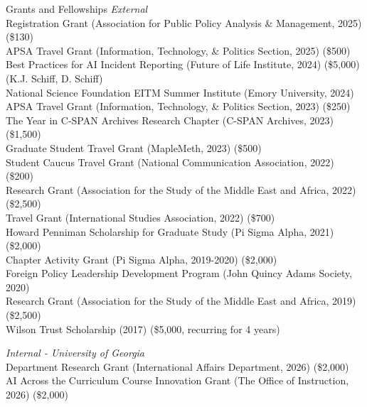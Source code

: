 \documentclass{resume} %
\begin{document}
\begin{rSection}{Grants and Fellowships}
{\it External}
\\ Registration Grant (Association for Public Policy Analysis \& Management, 2025) (\$130)
\\ APSA Travel Grant (Information, Technology, \& Politics Section, 2025) (\$500)
\\Best Practices for AI Incident Reporting (Future of Life Institute, 2024) (\$5,000) (K.J. Schiff, D. Schiff) %
\\National Science Foundation EITM Summer Institute (Emory University, 2024)
\\APSA Travel Grant (Information, Technology, \& Politics Section, 2023) (\$250)
\\The Year in C-SPAN Archives Research Chapter (C-SPAN Archives, 2023) (\$1,500)
\\Graduate Student Travel Grant (MapleMeth, 2023) (\$500)
\\Student Caucus Travel Grant (National Communication Association, 2022) (\$200)
\\Research Grant (Association for the Study of the Middle East and Africa, 2022) (\$2,500)
\\Travel Grant (International Studies Association, 2022) (\$700)
\\Howard Penniman Scholarship for Graduate Study (Pi Sigma Alpha, 2021) (\$2,000)
\\Chapter Activity Grant (Pi Sigma Alpha, 2019-2020) (\$2,000)
\\Foreign Policy Leadership Development Program (John Quincy Adams Society, 2020)
\\Research Grant (Association for the Study of the Middle East and Africa, 2019) (\$2,500)
\\Wilson Trust Scholarship (2017) (\$5,000, recurring for 4 years)

{\it Internal - University of Georgia}
\\Department Research Grant (International Affairs Department, 2026) (\$2,000)
\\AI Across the Curriculum Course Innovation Grant (The Office of Instruction, 2026) (\$2,000)


\end{rSection}
\end{document}
